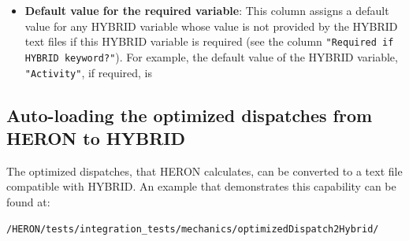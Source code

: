 \begin{itemize}
 For example, the HYBRID variable, \verb|"Activity"|, will be included if the \verb|"VOM"| cash flow is present since the node  will be incomplete if the  sub-node is missing. Therefore, for the HYBRID variable, \verb|"Activity"|, the corresponding value under the \verb|"Required if HYBRID keyword?"| column is \verb|"VOM"|

 \item \textbf{Default value for the required variable}: This column assigns a default value for any HYBRID variable whose value is not provided by the HYBRID text files if this HYBRID variable is required (see the column \verb|"Required if HYBRID keyword?"|). For example, the default value of the HYBRID variable, \verb|"Activity"|, if required, is 
\end{itemize}

\subsection{Auto-loading the optimized dispatches from HERON to HYBRID}
The optimized dispatches, that HERON calculates, can be converted to a text file compatible with HYBRID. An example that demonstrates this capability can be found at:
\begin{lstlisting}
/HERON/tests/integration_tests/mechanics/optimizedDispatch2Hybrid/
\end{lstlisting}



